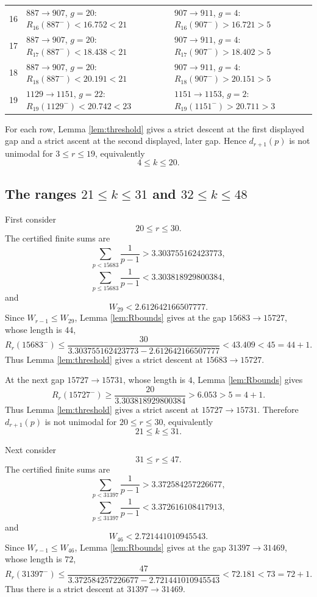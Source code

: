 \documentclass[11pt]{article}
\numberwithin{equation}{section}
\theoremstyle{plain}
\theoremstyle{definition}
\theoremstyle{remark}
\begin{document}
\begin{table}[htbp]
\begin{tabularx}{\textwidth}{cYY}
16 & \(887\to907\), \(g=20\): \(R_{16}(887^-)<16.752<21\) & \(907\to911\), \(g=4\): \(R_{16}(907^-)>16.721>5\) \\
17 & \(887\to907\), \(g=20\): \(R_{17}(887^-)<18.438<21\) & \(907\to911\), \(g=4\): \(R_{17}(907^-)>18.402>5\) \\
18 & \(887\to907\), \(g=20\): \(R_{18}(887^-)<20.191<21\) & \(907\to911\), \(g=4\): \(R_{18}(907^-)>20.151>5\) \\
19 & \(1129\to1151\), \(g=22\): \(R_{19}(1129^-)<20.742<23\) & \(1151\to1153\), \(g=2\): \(R_{19}(1151^-)>20.711>3\) \\
\bottomrule
\end{tabularx}
\end{table}
\FloatBarrier

For each row, Lemma \ref{lem:threshold} gives a strict descent at the first displayed gap and a strict ascent at the second displayed, later gap.  Hence \(d_{r+1}(p)\) is not unimodal for \(3\le r\le 19\), equivalently
\[
        4\le k\le 20.
\]

\subsection{The ranges \texorpdfstring{\(21\le k\le31\)}{21 <= k <= 31} and \texorpdfstring{\(32\le k\le48\)}{32 <= k <= 48}}

First consider
\[
        20\le r\le 30.
\]
The certified finite sums are
\[
        \sum_{p<15683}\frac1{p-1}
        >3.303755162423773,
\]
\[
        \sum_{p\le 15683}\frac1{p-1}
        <3.303818929800384,
\]
and
\[
        W_{29}<2.612642166507777.
\]
Since \(W_{r-1}\le W_{29}\), Lemma \ref{lem:Rbounds} gives at the gap \(15683\to15727\), whose length is \(44\),
\[
        R_r(15683^-)
        \le
        \frac{30}{3.303755162423773-2.612642166507777}
        <43.409<45=44+1.
\]
Thus Lemma \ref{lem:threshold} gives a strict descent at \(15683\to15727\).

At the next gap \(15727\to15731\), whose length is \(4\), Lemma \ref{lem:Rbounds} gives
\[
        R_r(15727^-)
        \ge
        \frac{20}{3.303818929800384}
        >6.053>5=4+1.
\]
Thus Lemma \ref{lem:threshold} gives a strict ascent at \(15727\to15731\).  Therefore \(d_{r+1}(p)\) is not unimodal for \(20\le r\le 30\), equivalently
\[
        21\le k\le 31.
\]

Next consider
\[
        31\le r\le 47.
\]
The certified finite sums are
\[
        \sum_{p<31397}\frac1{p-1}
        >3.372584257226677,
\]
\[
        \sum_{p\le31397}\frac1{p-1}
        <3.372616108417913,
\]
and
\[
        W_{46}<2.721441010945543.
\]
Since \(W_{r-1}\le W_{46}\), Lemma \ref{lem:Rbounds} gives at the gap \(31397\to31469\), whose length is \(72\),
\[
        R_r(31397^-)
        \le
        \frac{47}{3.372584257226677-2.721441010945543}
        <72.181<73=72+1.
\]
Thus there is a strict descent at \(31397\to31469\).
\end{document}
